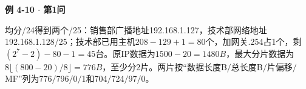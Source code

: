 {\color{ink}\bfseries 例 4-10 \(\cdot \) 第1问}\par\vspace{1bp}均分/\allowbreak{}24得到两个/\allowbreak{}25：销售部广播地址192.168.1.127，技术部网络地址192.168.1.128/\allowbreak{}25；技术部已用主机\(208-129+\allowbreak{}1=\allowbreak{}80\)个，加网关.254占1个，剩\((2^{7}-2)-80-1=\allowbreak{}45\)台。原IP数据为\(1500-20=\allowbreak{}1480 B\)，最大分片数据为\(8\lfloor (800-20)/\allowbreak{}8\rfloor =\allowbreak{}776 B\)，至少分2片。两片按“数据长度B\(/\allowbreak{}\)总长度B\(/\allowbreak{}\)片偏移\(/\allowbreak{}\)MF”列为776\(/\allowbreak{}\)796\(/\allowbreak{}\)0\(/\allowbreak{}\)1和704\(/\allowbreak{}\)724\(/\allowbreak{}\)97\(/\allowbreak{}\)0。
